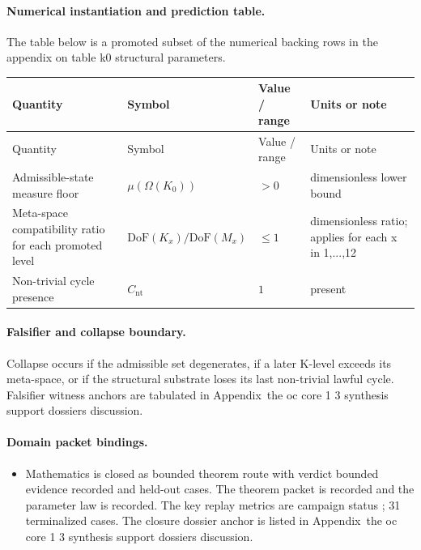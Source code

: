 \paragraph{Numerical instantiation and prediction table.}
The table below is a promoted subset of the numerical backing rows in the appendix on table k0 structural parameters.
\begin{longtable}{@{}L{0.27\textwidth}L{0.15\textwidth}L{0.24\textwidth}L{0.16\textwidth}@{}}
\toprule
Quantity & Symbol & Value / range & Units or note \\
\midrule
\endfirsthead
\toprule
Quantity & Symbol & Value / range & Units or note \\
\midrule
\endhead
Admissible-state measure floor & $\scriptstyle \mu(\Omega(K_0))$ & $> 0$ & dimensionless lower bound \\
Meta-space compatibility ratio for each promoted level & $\scriptstyle \mathrm{DoF}(K_x)/\allowbreak \mathrm{DoF}(M_x)$ & $\leq 1$ & dimensionless ratio; applies for each x in 1,...,12 \\
Non-trivial cycle presence & $\scriptstyle C_{\mathrm{nt}}$ & $1$ & present \\
\bottomrule
\end{longtable}

\paragraph{Falsifier and collapse boundary.}
Collapse occurs if the admissible set degenerates, if a later K-level exceeds its meta-space, or if the structural substrate loses its last non-trivial lawful cycle.
Falsifier witness anchors are tabulated in Appendix~the oc core 1 3 synthesis support dossiers discussion.

\paragraph{Domain packet bindings.}
\begin{itemize}[leftmargin=1.6em,nosep]
\item Mathematics is closed as bounded theorem route with verdict bounded evidence recorded and  held-out cases. The theorem packet is recorded and the parameter law is recorded. The key replay metrics are campaign status ; 31 terminalized cases. The closure dossier anchor is listed in Appendix~the oc core 1 3 synthesis support dossiers discussion.
\end{itemize}

